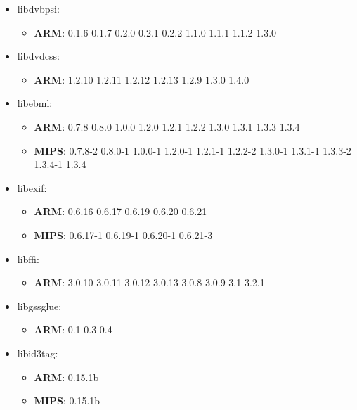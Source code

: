 \documentclass[twocolumn,a4paper]{IEEEtran} %
\begin{document}
\begin{itemize}[noitemsep,topsep=0pt,parsep=0pt,partopsep=0pt]
\item libdvbpsi:
\begin{itemize}[noitemsep,topsep=0pt,parsep=0pt,partopsep=0pt]
  \item \textbf{ARM}: 0.1.6 0.1.7 0.2.0 0.2.1 0.2.2 1.1.0 1.1.1 1.1.2 1.3.0
\end{itemize}

\item libdvdcss:
\begin{itemize}[noitemsep,topsep=0pt,parsep=0pt,partopsep=0pt]
  \item \textbf{ARM}: 1.2.10 1.2.11 1.2.12 1.2.13 1.2.9 1.3.0 1.4.0
\end{itemize}

\item libebml:
\begin{itemize}[noitemsep,topsep=0pt,parsep=0pt,partopsep=0pt]
  \item \textbf{ARM}: 0.7.8 0.8.0 1.0.0 1.2.0 1.2.1 1.2.2 1.3.0 1.3.1 1.3.3 1.3.4
  \item \textbf{MIPS}: 0.7.8-2 0.8.0-1 1.0.0-1 1.2.0-1 1.2.1-1 1.2.2-2 1.3.0-1 1.3.1-1 1.3.3-2 1.3.4-1 1.3.4
\end{itemize}

\item libexif:
\begin{itemize}[noitemsep,topsep=0pt,parsep=0pt,partopsep=0pt]
  \item \textbf{ARM}: 0.6.16 0.6.17 0.6.19 0.6.20 0.6.21
  \item \textbf{MIPS}: 0.6.17-1 0.6.19-1 0.6.20-1 0.6.21-3
\end{itemize}

\item libffi:
\begin{itemize}[noitemsep,topsep=0pt,parsep=0pt,partopsep=0pt]
  \item \textbf{ARM}: 3.0.10 3.0.11 3.0.12 3.0.13 3.0.8 3.0.9 3.1 3.2.1
\end{itemize}

\item libgssglue:
\begin{itemize}[noitemsep,topsep=0pt,parsep=0pt,partopsep=0pt]
  \item \textbf{ARM}: 0.1 0.3 0.4
\end{itemize}

\item libid3tag:
\begin{itemize}[noitemsep,topsep=0pt,parsep=0pt,partopsep=0pt]
  \item \textbf{ARM}: 0.15.1b
  \item \textbf{MIPS}: 0.15.1b
\end{itemize}


\end{itemize}
\end{document}
